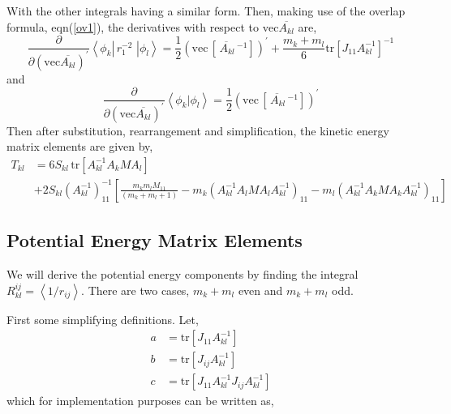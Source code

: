 \documentclass[12pt]{article}
\begin{document}
With the other integrals having a similar form. Then, making use of the
overlap formula, eqn(\ref{ov1}), the derivatives with respect to
$\mathrm{vec}\overline{A_{kl}}$ are,
\begin{equation}
\frac{\partial}{\partial\left(  \mathrm{vec}\overline{A_{kl}}\right)
^{\prime}}\left\langle \phi_{k}\right|  \,r_{1}^{-2}\,\mathbf{\,}\left|
\phi_{l}\right\rangle =\frac{1}{2}\left(  \mathrm{vec}\,\left[  \overline
{\,A_{kl}}\,^{-1}\right]  \right)  ^{\prime}+\frac{m_{k}+m_{l}}{6}%
\mathrm{tr}\left[  J_{11}A_{kl}^{-1}\right]  ^{-1}%
\end{equation}
and
\begin{equation}
\frac{\partial}{\partial\left(  \mathrm{vec}\overline{A_{kl}}\right)
^{\prime}}\left\langle \phi_{k}\right.  |\left.  \phi_{l}\right\rangle
=\frac{1}{2}\left(  \mathrm{vec}\,\left[  \overline{\,A_{kl}}\,^{-1}\right]
\right)  ^{\prime}%
\end{equation}
Then after substitution, rearrangement and simplification, the kinetic energy
matrix elements are given by,
\begin{align}
T_{kl}  & =6S_{kl}\,\mathrm{tr}\left[  A_{kl}^{-1}A_{k}MA_{l}\right]
\label{Tkl}\\
& +2S_{kl}\left(  A_{kl}^{-1}\right)  _{11}^{-1}\left[  \frac{m_{k}m_{l}%
M_{11}}{\left(  m_{k}+m_{l}+1\right)  }-m_{k}\left(  A_{kl}^{-1}A_{l}%
MA_{l}A_{kl}^{-1}\right)  _{11}-m_{l}\left(  A_{kl}^{-1}A_{k}MA_{k}A_{kl}%
^{-1}\right)  _{11}\right]
\end{align}

\subsection{Potential Energy Matrix Elements}

We will derive the potential energy components by finding the integral
$R_{kl}^{ij}=\left\langle 1/r_{ij}\right\rangle .$ There are two cases,
$m_{k}+m_{l}$ even and $m_{k}+m_{l}$ odd.

First some simplifying definitions. Let,
\begin{align}
a  & =\mathrm{tr}\left[  J_{11}A_{kl}^{-1}\right] \label{adef}\\
b  & =\mathrm{tr}\left[  J_{ij}A_{kl}^{-1}\right] \label{bdef}\\
c  & =\mathrm{tr}\left[  J_{11}A_{kl}^{-1}J_{ij}A_{kl}^{-1}\right]
\label{cdef}%
\end{align}
which for implementation purposes can be written as,%
\end{document}
